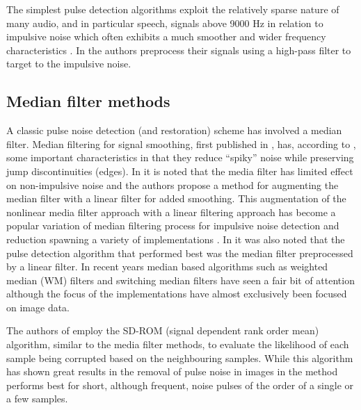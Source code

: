 The simplest pulse detection algorithms exploit the relatively sparse nature of many audio, and in particular speech, signals above 9000 Hz in relation to impulsive noise which often exhibits a much smoother and wider frequency characteristics \cite{Subramanya2007}. In \cite{Kasparis1993}\cite{US6795559} the authors preprocess their signals using a high-pass filter to target to the impulsive noise.

\subsection{Median filter methods}\label{sec:LitRevDetMedianFilts}
A classic pulse noise detection (and restoration) scheme has involved a median filter\cite{Tukey1974}\cite{Lee1985}\cite{Heinonen1985}\cite{Heinonen1987}\cite{Maekivirta1991}\cite{Kasparis1993}.
Median filtering for signal smoothing, first published in \cite{Tukey1974}, has, according to \cite{Brillinger2002}, some important characteristics in that they reduce ``spiky'' noise while preserving jump discontinuities (edges). In \cite{Lee1985} it is noted that the media filter has limited effect on non-impulsive noise and the authors propose a method for augmenting the median filter with a linear filter for added smoothing. This augmentation of the nonlinear media filter approach with a linear filtering approach has become a popular variation of median filtering process for impulsive noise detection and reduction spawning a variety of implementations \cite{Lee1985}\cite{Heinonen1985}\cite{Nieminen1987}\cite{Kasparis1993}\cite{Loveridge1995}. In \cite{Kauppinen2002} it was also noted that the pulse detection algorithm that performed best was the median filter preprocessed by a linear filter. In recent years median based algorithms such as weighted median (WM) filters \cite{Yin1996}\cite{Wang2010} and switching median filters \cite{Abreu1996}\cite{Chen2000}\cite{Chen2001}\cite{Lin2007} have seen a fair bit of attention although the focus of the implementations have almost exclusively been focused on image data.

The authors of \cite{Chandra1998} employ the SD-ROM (signal dependent rank order mean) algorithm, similar to the media filter methods, to evaluate the likelihood of each sample being corrupted based on the neighbouring samples. While this algorithm has shown great results in the removal of pulse noise in images \cite{Abreu1996} in \cite{Chandra1998} the method performs best for short, although frequent, noise pulses of the order of a single or a few samples.

